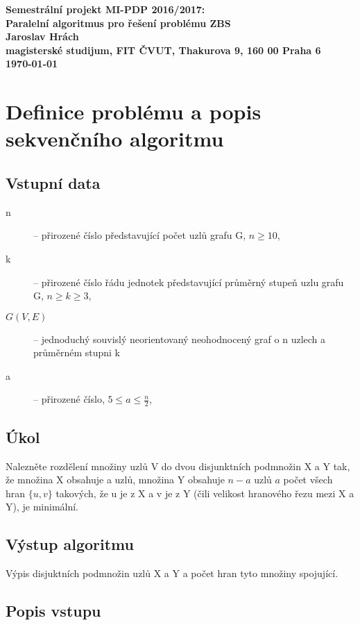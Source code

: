 \documentclass[a4paper, 12pt]{article}
\begin{document}
\begin{center}
\bf Semestrální projekt MI-PDP 2016/2017:\\[5mm]
    Paralelní algoritmus pro řešení problému ZBS\\[5mm]
       Jaroslav Hrách\\[2mm]
magisterské studijum, FIT ČVUT, Thakurova 9, 160 00 Praha 6\\[2mm]
\today
\end{center}

\section{Definice problému a popis sekvenčního algoritmu}
\subsection{Vstupní data}

\begin{description}
	\item[n] -- přirozené číslo představující počet uzlů grafu G, $n \geq 10$,
	\item[k] -- přirozené číslo řádu jednotek představující průměrný stupeň uzlu grafu G, $n \geq k \geq 3$,
	\item[$G(V,E)$] -- jednoduchý souvislý neorientovaný neohodnocený graf o n uzlech a průměrném stupni k
	\item[a] -- přirozené číslo, $5 \leq a \leq \frac{n}{2}$,

\end{description}

\subsection{Úkol}

Nalezněte rozdělení množiny uzlů V do dvou disjunktních podmnožin X a Y tak, že množina X obsahuje a uzlů, množina Y obsahuje $n-a$ uzlů $a$ počet všech hran $\{u,v\}$ takových, že u je z X a v je z Y (čili velikost hranového řezu mezi X a Y), je minimální.

\subsection{Výstup algoritmu}

Výpis disjuktních podmnožin uzlů X a Y a počet hran tyto množiny spojující.

\subsection{Popis vstupu}
\end{document}

